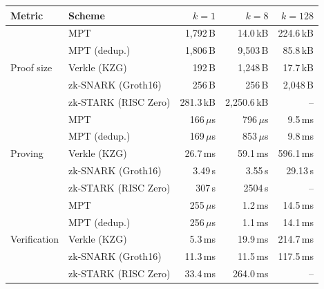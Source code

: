\begin{tabular}{llrrr}
\toprule
Metric & Scheme & $k=1$ & $k=8$ & $k=128$ \\
\midrule
\multirow{5}{*}{Proof size} & MPT & 1,792\,B & 14.0\,kB & 224.6\,kB \\
 & MPT (dedup.) & 1,806\,B & 9,503\,B & 85.8\,kB \\
 & Verkle (KZG) & 192\,B & 1,248\,B & 17.7\,kB \\
 & zk-SNARK (Groth16) & 256\,B & 256\,B & 2,048\,B \\
 & zk-STARK (RISC Zero) & 281.3\,kB & 2,250.6\,kB & -- \\
\midrule
\multirow{5}{*}{Proving} & MPT & 166\,$\mu$s & 796\,$\mu$s & 9.5\,ms \\
 & MPT (dedup.) & 169\,$\mu$s & 853\,$\mu$s & 9.8\,ms \\
 & Verkle (KZG) & 26.7\,ms & 59.1\,ms & 596.1\,ms \\
 & zk-SNARK (Groth16) & 3.49\,s & 3.55\,s & 29.13\,s \\
 & zk-STARK (RISC Zero) & 307\,s & 2504\,s & -- \\
\midrule
\multirow{5}{*}{Verification} & MPT & 255\,$\mu$s & 1.2\,ms & 14.5\,ms \\
 & MPT (dedup.) & 256\,$\mu$s & 1.1\,ms & 14.1\,ms \\
 & Verkle (KZG) & 5.3\,ms & 19.9\,ms & 214.7\,ms \\
 & zk-SNARK (Groth16) & 11.3\,ms & 11.5\,ms & 117.5\,ms \\
 & zk-STARK (RISC Zero) & 33.4\,ms & 264.0\,ms & -- \\
\bottomrule
\end{tabular}
